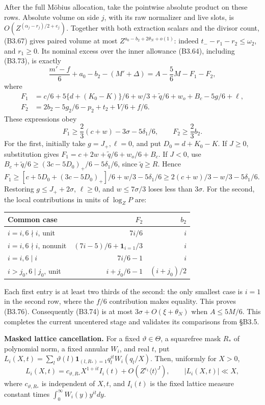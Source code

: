 \documentclass[11pt,a4paper]{article}
\begin{document}
After the full Möbius allocation, take the pointwise absolute product on
these rows. Absolute volume on side \(j\), with its raw normalizer and
live slots, is \(O(Z^{(\alpha_j-r_j)/2+e_j})\). Together with both
extraction scalars and the divisor count, (B3.67) gives paired volume at
most \(Z^{a_0-b_2+2\theta_N+o(1)}\): indeed \(t_--r_1-r_2\le\omega_2\),
and \(r_1\ge0\). Its nominal excess over the inner allowance (B3.64),
including (B3.73), is exactly \[
\frac{m'-f}{6}+a_0-b_2-(M'+\Delta)
=A-\frac56M-F_1-F_2,
\tag{B3.74}
\] where \[
\begin{aligned}
F_1&=c/6+5\{d+(K_0-K)\}/6+w/3+\widetilde q/6+w_o+B_c-5g/6+\ell,\\
F_2&=2b_2-5g_2/6-p_2+t_2+V/6+f/6.
\end{aligned}\tag{B3.75}
\] These expressions obey \[
F_1\ge\frac23(c+w)-3\sigma-5\delta_1/6,
\qquad F_2\ge\frac23b_2.
\tag{B3.76}
\] For the first, initially take \(g=J_+,\allowbreak{}\ell=0\), and put
\(D_0=d+K_0-K\). If \(J\ge0\), substitution gives
\(F_1=c+2w+\widetilde q/6+w_o/6+B_c\). If \(J<0\), use
\(B_c+\widetilde q/6\ge(3c-5D_0)_+/6-5\delta_1/6\), since
\(\widetilde q\ge R\). Hence
\(F_1\ge[c+5D_0+(3c-5D_0)_+]/6+w/3-5\delta_1/6\ge2(c+w)/3-w/3-5\delta_1/6\).
Restoring \(g\le J_++2\sigma\), \(\ell\ge0\), and \(w\le7\sigma/3\)
loses less than \(3\sigma\). For the second, the local contributions in
units of \(\log_ZP\) are:

\begin{longtable}[]{@{}lrr@{}}
\toprule\noalign{}
Common case & \(F_2\) & \(b_2\) \\
\midrule\noalign{}
\endhead
\bottomrule\noalign{}
\endlastfoot
\(i=i,\allowbreak{}6\nmid i\), unit & \(7i/6\) & \(i\) \\
\(i=i,\allowbreak{}6\nmid i\), nonunit & \((7i-5)/6+\mathbf1_{i=1}/3\) & \(i\) \\
\(i=i,\allowbreak{}6\mid i\) & \(7i/6-1\) & \(i\) \\
\(i>j_0,\allowbreak{}6\mid j_0\), unit & \(i+j_0/6-1\) & \((i+j_0)/2\) \\
\end{longtable}

Each first entry is at least two thirds of the second: the only smallest
case is \(i=1\) in the second row, where the \(f/6\) contribution makes
equality. This proves (B3.76). Consequently (B3.74) is at most
\(3\sigma+O(\xi+\theta_N)\) when \(A\le5M/6\). This completes the
current uncentered stage and validates its comparisons from §B3.5.

\textbf{Masked lattice cancellation.} For a fixed
\(\vartheta\in\Theta\), a squarefree mask \(R_*\) of polynomial norm, a
fixed annular \(W_i\), and real \(t\), put
\(L_i(X,\allowbreak{}t)=\sum_l\vartheta(l)\mathbf1_{(l,\allowbreak{}R_*)=1}q_l^{it}W_i(q_l/X)\).
Then, uniformly for \(X>0\), \[
L_i(X,t)=c_{\vartheta,R_*}X^{1+it}I_i(t)
 +O(Z^{\epsilon_1}\langle t\rangle^J),\qquad |L_i(X,t)|\ll X,
\tag{B3.77}
\] where \(c_{\vartheta,\allowbreak{}R_*}\) is independent of \(X,\allowbreak{}t\), and \(I_i(t)\)
is the fixed lattice measure constant times
\(\int_0^\infty W_i(y)y^{it}dy\).
\end{document}
